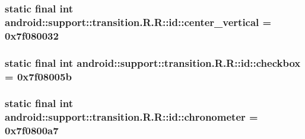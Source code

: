 \hypertarget{classandroid_1_1support_1_1transition_1_1_r_1_1id_1c3bea8d397b4dfcd28e3c7ee2655195}{
\subsubsection[{center\_\-vertical}]{\setlength{\rightskip}{0pt plus 5cm}static final int android::support::transition.R.R::id::center\_\-vertical = 0x7f080032}}
\label{classandroid_1_1support_1_1transition_1_1_r_1_1id_1c3bea8d397b4dfcd28e3c7ee2655195}


\hypertarget{classandroid_1_1support_1_1transition_1_1_r_1_1id_10983d40c5b2019d4180951dba06ed4a}{
\subsubsection[{checkbox}]{\setlength{\rightskip}{0pt plus 5cm}static final int android::support::transition.R.R::id::checkbox = 0x7f08005b}}
\label{classandroid_1_1support_1_1transition_1_1_r_1_1id_10983d40c5b2019d4180951dba06ed4a}


\hypertarget{classandroid_1_1support_1_1transition_1_1_r_1_1id_2b29fdeb55a58bf1e46e707928860452}{
\subsubsection[{chronometer}]{\setlength{\rightskip}{0pt plus 5cm}static final int android::support::transition.R.R::id::chronometer = 0x7f0800a7}}
\label{classandroid_1_1support_1_1transition_1_1_r_1_1id_2b29fdeb55a58bf1e46e707928860452}


